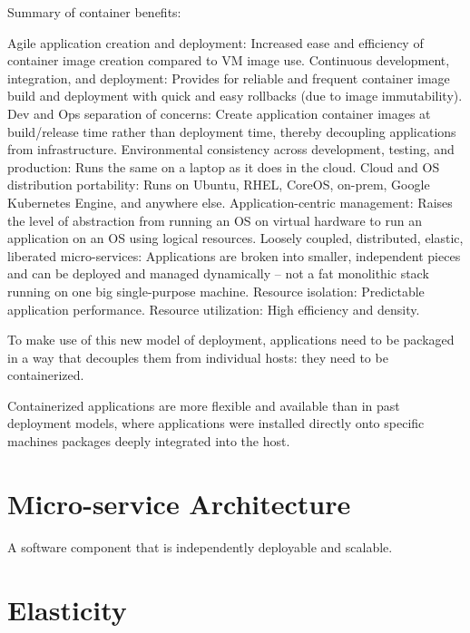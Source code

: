 Summary of container benefits:

Agile application creation and deployment: Increased ease and efficiency of container image creation compared to VM image use.
Continuous development, integration, and deployment: Provides for reliable and frequent container image build and deployment with quick and easy rollbacks (due to image immutability).
Dev and Ops separation of concerns: Create application container images at build/release time rather than deployment time, thereby decoupling applications from infrastructure.
Environmental consistency across development, testing, and production: Runs the same on a laptop as it does in the cloud.
Cloud and OS distribution portability: Runs on Ubuntu, RHEL, CoreOS, on-prem, Google Kubernetes Engine, and anywhere else.
Application-centric management: Raises the level of abstraction from running an OS on virtual hardware to run an application on an OS using logical resources.
Loosely coupled, distributed, elastic, liberated micro-services: Applications are broken into smaller, independent pieces and can be deployed and managed dynamically – not a fat monolithic stack running on one big single-purpose machine.
Resource isolation: Predictable application performance.
Resource utilization: High efficiency and density.

To make use of this new model of deployment, applications need to be packaged in a way that decouples them from individual hosts: they need to be containerized.

Containerized applications are more flexible and available than in past deployment models, where applications were installed directly onto specific machines packages deeply integrated into the host.


\section{Micro-service Architecture}
\label{sec:containers-orchestration-micro-service-architecture}

A software component that is independently deployable and scalable.



\section{Elasticity}
\label{sec:containers-orchestration-elasticity}

\lipsum[1]

